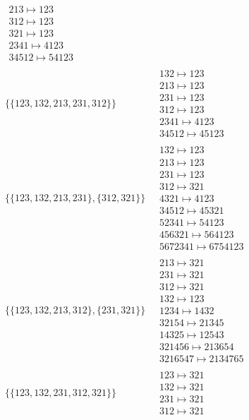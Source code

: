 \begin{scriptsize}
\begin{align}
\begin{matrix}
\\
213 \mapsto 123
\\
312 \mapsto 123
\\
321 \mapsto 123
\\
2341 \mapsto 4123
\\
34512 \mapsto 54123
\end{matrix}
\\
\{\{123, 132, 213, 231, 312\}\}
\ 
&
\begin{matrix}
132 \mapsto 123
\\
213 \mapsto 123
\\
231 \mapsto 123
\\
312 \mapsto 123
\\
2341 \mapsto 4123
\\
34512 \mapsto 45123
\end{matrix}
\\
\{\{123, 132, 213, 231\}, \{312, 321\}\}
\ 
&
\begin{matrix}
132 \mapsto 123
\\
213 \mapsto 123
\\
231 \mapsto 123
\\
312 \mapsto 321
\\
4321 \mapsto 4123
\\
34512 \mapsto 45321
\\
52341 \mapsto 54123
\\
456321 \mapsto 564123
\\
5672341 \mapsto 6754123
\end{matrix}
\\
\{\{123, 132, 213, 312\}, \{231, 321\}\}
\ 
&
\begin{matrix}
213 \mapsto 321
\\
231 \mapsto 321
\\
312 \mapsto 321
\\
132 \mapsto 123
\\
1234 \mapsto 1432
\\
32154 \mapsto 21345
\\
14325 \mapsto 12543
\\
321456 \mapsto 213654
\\
3216547 \mapsto 2134765
\end{matrix}
\\
\{\{123, 132, 231, 312, 321\}\}
\ 
&
\begin{matrix}
123 \mapsto 321
\\
132 \mapsto 321
\\
231 \mapsto 321
\\
312 \mapsto 321

\end{matrix}
\end{align}
\end{scriptsize}
